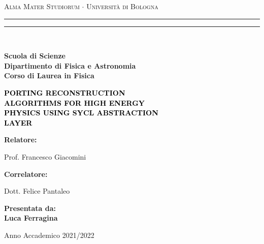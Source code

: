 \documentclass[12pt,a4paper]{report}
\begin{document}
\begin{titlepage}
\begin{center}
{{\Large{\textsc{Alma Mater Studiorum $\cdot$ Universit\`a di Bologna}}}} 
\rule[0.1cm]{15.8cm}{0.1mm}
\rule[0.5cm]{15.8cm}{0.6mm}
\\\vspace{3mm}

{\small{\bf Scuola di Scienze \\ 
Dipartimento di Fisica e Astronomia\\
Corso di Laurea in Fisica}}

\end{center}

\vspace{23mm}

\begin{center}\textcolor{black}{
{\LARGE{\bf PORTING RECONSTRUCTION \\ ALGORITHMS FOR HIGH ENERGY \\ PHYSICS USING SYCL ABSTRACTION \\ LAYER \\}}
}\end{center}

\vspace{50mm} \par \noindent

\begin{minipage}[t]{0.47\textwidth}

\large{\bf Relatore: \vspace{2mm}

{Prof. Francesco Giacomini}}

\vspace{5mm}

\large{\bf Correlatore: \vspace{2mm}

{Dott. Felice Pantaleo}}

\end{minipage}
\hfill
\begin{minipage}[t]{0.47\textwidth}\raggedleft
{\large{\bf Presentata da:
\vspace{2mm}\\
Luca Ferragina}}
\end{minipage}

\vspace{20mm}

\begin{center}
Anno Accademico 2021/2022
\end{center}

\end{titlepage}
\end{document}
